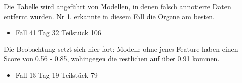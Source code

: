 Die Tabelle wird angeführt von Modellen, in denen falsch annotierte Daten entfernt wurden. Nr 1. erkannte in diesem Fall die Organe am besten.

\pagebreak

\begin{itemize}
\item Fall 41 Tag 32 Teilstück 106
\end{itemize}

\begin{table}[H]
\centering
{}
\caption{Siehe Abb. \ref{Fig:case41_day32_slice_0106}}\label{tab:analysis-clean-data}
\end{table}

Die Beobachtung setzt sich hier fort: Modelle ohne jenes Feature haben einen Score von 0.56 - 0.85, wohingegen die restlichen auf über 0.91 kommen. 

\begin{itemize}
\item Fall 18 Tag 19 Teilstück 79
\end{itemize}

